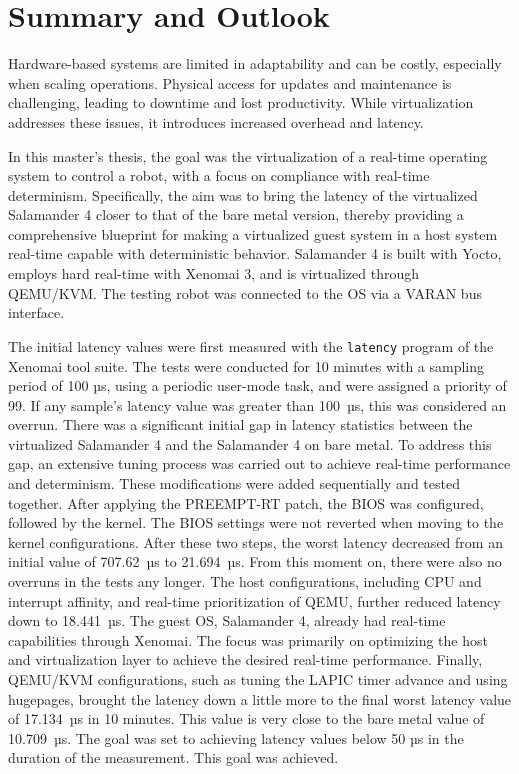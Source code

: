 \documentclass[MMR,Master,english]{style/twbook}
\begin{document}
\clearpage

\chapter{Summary and Outlook}\label{cha:summary_and_outlook}
Hardware-based systems are limited in adaptability and can be costly, especially when scaling operations. Physical access for updates and maintenance is challenging, leading to downtime and lost productivity. While virtualization addresses these issues, it introduces increased overhead and latency.

\bigskip \noindent In this master's thesis, the goal was the virtualization of a real-time operating system to control a robot, with a focus on compliance with real-time determinism. Specifically, the aim was to bring the latency of the virtualized Salamander 4 closer to that of the bare metal version, thereby providing a comprehensive blueprint for making a virtualized guest system in a host system real-time capable with deterministic behavior. Salamander 4 is built with Yocto, employs hard real-time with Xenomai 3, and is virtualized through QEMU/KVM. The testing robot was connected to the OS via a VARAN bus interface.

\bigskip \noindent The initial latency values were first measured with the \texttt{latency} program of the Xenomai tool suite. The tests were conducted for 10 minutes with a sampling period of 100 µs, using a periodic user-mode task, and were assigned a priority of 99. If any sample's latency value was greater than 100~µs, this was considered an overrun. There was a significant initial gap in latency statistics between the virtualized Salamander 4 and the Salamander 4 on bare metal. To address this gap, an extensive tuning process was carried out to achieve real-time performance and determinism. These modifications were added sequentially and tested together. After applying the PREEMPT-RT patch, the BIOS was configured, followed by the kernel. The BIOS settings were not reverted when moving to the kernel configurations. After these two steps, the worst latency decreased from an initial value of 707.62~µs to 21.694~µs. From this moment on, there were also no overruns in the tests any longer. The host configurations, including CPU and interrupt affinity, and real-time prioritization of QEMU, further reduced latency down to 18.441~µs. The guest OS, Salamander 4, already had real-time capabilities through Xenomai. The focus was primarily on optimizing the host and virtualization layer to achieve the desired real-time performance. Finally, QEMU/KVM configurations, such as tuning the LAPIC timer advance and using hugepages, brought the latency down a little more to the final worst latency value of 17.134~µs in 10 minutes. This value is very close to the bare metal value of 10.709~µs. The goal was set to achieving latency values below 50 µs in the duration of the measurement. This goal was achieved.
\end{document}

